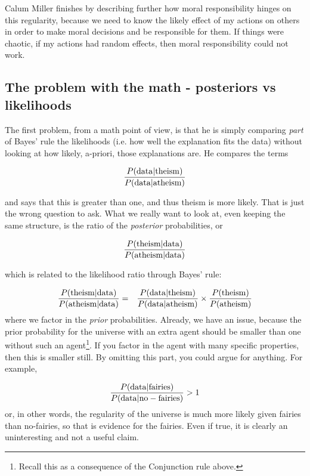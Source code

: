 Calum Miller finishes by describing further how moral responsibility hinges on this regularity, because we need to know the likely effect of my actions on others in order to make moral decisions and be responsible for them. If things were chaotic, if my actions had random effects, then moral responsibility could not work.

\subsection{The problem with the math - posteriors vs
likelihoods}\label{the-problem-with-the-math---posteriors-vs-likelihoods}

The first problem, from a math point of view, is that he is simply comparing {\em part} of Bayes' rule the likelihoods (i.e. how well the explanation fits the data) without looking at how likely, a-priori, those explanations are.  He compares the terms

\begin{eqnarray*}
\frac{P({\rm data}|{\rm theism})}{P({\rm data}|{\rm atheism})}
\end{eqnarray*}

and says that this is greater than one, and thus theism is more
likely. That is just the wrong question to ask. What we really want to
look at, even keeping the same structure, is the ratio of the
\emph{posterior} probabilities, or

\begin{eqnarray*}
\frac{P({\rm theism}|{\rm data})}{P({\rm atheism}|{\rm data})}
\end{eqnarray*}

which is related to the likelihood ratio through Bayes' rule:

\begin{eqnarray*}
\frac{P({\rm theism}|{\rm data})}{P({\rm atheism}|{\rm data})} &=& \frac{P({\rm data}|{\rm theism})}{P({\rm data}|{\rm atheism})} \times \frac{P({\rm theism})}{P({\rm atheism})}
\end{eqnarray*}
where we factor in the \emph{prior} probabilities. Already, we have an
issue, because the prior probability for the universe with an extra
agent should be smaller than one without such an agent\footnote{Recall this as a consequence of the Conjunction rule above.}. If you factor in
the agent with many specific properties, then this is smaller still.
By omitting this part, you could argue for anything. For example,

\begin{eqnarray*}
\frac{P({\rm data}|{\rm fairies})}{P({\rm data}|{\rm no-fairies})}>1
\end{eqnarray*}
or, in other words, the regularity of the universe is much more likely given fairies than no-fairies, so that is evidence for the fairies. Even if true, it is clearly an uninteresting and not a useful claim.

